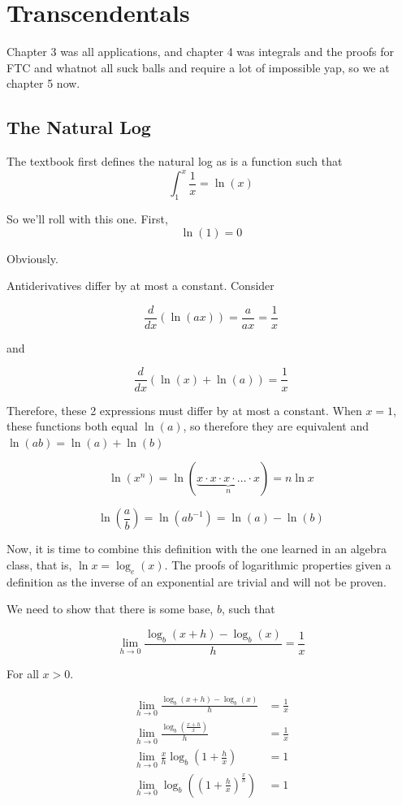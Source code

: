 \clearpage
\section{Transcendentals}

Chapter 3 was all applications, and chapter 4 was integrals and the proofs for FTC and whatnot all suck balls and require a lot of impossible yap, so we at chapter 5 now. 


\subsection{The Natural Log}

The textbook first defines the natural log as is a function such that 
\[\int _1 ^x \frac{1}{x} = \ln(x)\]

So we'll roll with this one. First, 
\[\ln(1) = 0\]

Obviously.

Antiderivatives differ by at most a constant. Consider

\[\frac{d}{dx}(\ln(ax)) = \frac{a}{ax} = \frac{1}{x}\]

and

\[\frac{d}{dx}(\ln(x) + \ln(a)) = \frac{1}{x}\]

Therefore, these 2 expressions must differ by at most a constant. When $x=1$, these functions both equal $\ln(a)$, so therefore they are equivalent and $\boxed{\ln(ab) = \ln(a) + \ln(b)}$

\[\ln(x^n) = \ln(\underbrace{x \cdot x \cdot x \cdot \ldots \cdot x}_n) = \boxed{n \ln x}\]

\[\ln(\frac{a}{b}) = \ln(ab^{-1}) =\boxed{\ln(a) - \ln(b)}\]

Now, it is time to combine this definition with the one learned in an algebra class, that is, $\ln x = \log_e(x)$. The proofs of logarithmic properties given a definition as the inverse of an exponential are trivial and will not be proven.

We need to show that there is some base, $b$, such that 

\[\lim_{h \to 0} \frac{\log_b(x + h) - \log_b(x)}{h} = \frac{1}{x}\]

For all $x > 0$.

\begin{align}
    \lim_{h \to 0} \frac{\log_b(x + h) - \log_b(x)}{h} &= \frac{1}{x} \\
    \lim_{h \to 0} \frac{\log_b(\frac{x + h}{x})}{h} &= \frac{1}{x} \\
    \lim_{h \to 0} \frac{x}{h} \log_b(1 + \frac{h}{x}) &= 1 \\
    \lim_{h \to 0} \log_b({(1 + \frac{h}{x})^{\frac{x}{h}}}) &= 1 \\
\end{align}


